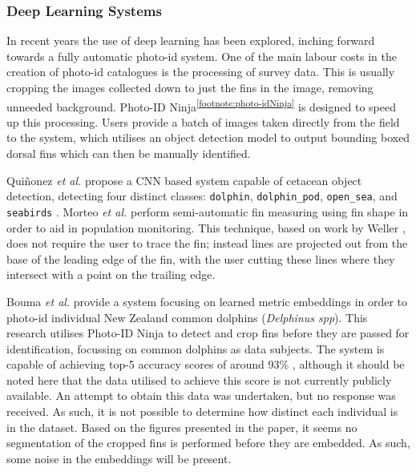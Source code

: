 \subsubsection{Deep Learning Systems}\label{ch:Background,sec:conTech,sub:photoIDAides,subsub:DL}

In recent years the use of deep learning has been explored, inching forward towards a fully automatic photo-id system. One of the main labour costs in the creation of photo-id catalogues is the processing of survey data. This is usually cropping the images collected down to just the fins in the image, removing unneeded background. Photo-ID Ninja\textsuperscript{\ref{footnote:photo-idNinja}} is designed to speed up this processing. Users provide a batch of images taken directly from the field to the system, which utilises an object detection model to output bounding boxed dorsal fins which can then be manually identified.

Qui\~{n}onez \textit{et al.} propose a CNN based system capable of cetacean object detection, detecting four distinct classes: \texttt{dolphin}, \texttt{dolphin\_pod}, \texttt{open\_sea}, and \texttt{seabirds} \cite{quinonez_using_2019}. Morteo \textit{et al.} \cite{morteo_phenotypic_2017} perform semi-automatic fin measuring using fin shape in order to aid in population monitoring. This technique, based on work by Weller \cite{weller_global_1998}, does not require the user to trace the fin; instead lines are projected out from the base of the leading edge of the fin, with the user cutting these lines where they intersect with a point on the trailing edge. 

Bouma \textit{et al.} provide a system focusing on learned metric embeddings in order to photo-id individual New Zealand common dolphins (\textit{Delphinus spp}). This research utilises Photo-ID Ninja to detect and crop fins before they are passed for identification, focussing on common dolphins as data subjects. The system is capable of achieving top-5 accuracy scores of around 93\% \cite{bouma_individual_2018}, although it should be noted here that the data utilised to achieve this score is not currently publicly available. An attempt to obtain this data was undertaken, but no response was received. As such, it is not possible to determine how distinct each individual is in the dataset. Based on the figures presented in the paper, it seems no segmentation of the cropped fins is performed before they are embedded. As such, some noise in the embeddings will be present. 

